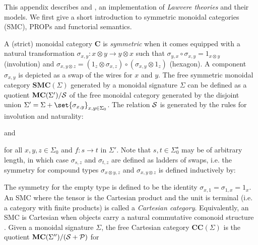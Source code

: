 
This appendix describes  and , an
implementation of \emph{Lawvere theories} and their models.
We first give a short introduction to symmetric monoidal categories (SMC), PROPs and functorial semantics.

A (strict) monoidal category $\mathbf{C}$ is \emph{symmetric} when it comes equipped
with a natural transformation $\sigma_{x, y} : x \otimes y \to y \otimes x$
such that $\sigma_{y, x} \circ \sigma_{x, y} = 1_{x \otimes y}$ (involution)
and $\sigma_{x, y \otimes z} =
(1_{z} \otimes \sigma_{x, z}) \circ (\sigma_{x, y} \otimes 1_{z})$ (hexagon).
A component $\sigma_{x, y}$ is depicted as a swap of the wires for $x$ and $y$.
The free symmetric monoidal category $\mathbf{SMC}(\Sigma)$ generated by a monoidal
signature $\Sigma$ can be defined as a quotient $\mathbf{MC}(\Sigma') / \cal{S}$ of
the free monoidal category generated by the disjoint union
$\Sigma' = \Sigma + \set{\sigma_{x, y}}_{x, y \in \Sigma_0}$. The relation
$\cal{S}$ is generated by the rules for involution and naturality:
\begin{center}

\qquad and \qquad \quad

\end{center}
for all $x, y, z \in \Sigma_0$ and $f : s \to t$ in $\Sigma'$. Note that
$s, t \in \Sigma_0^\star$ may be of arbitrary length, in which case $\sigma_{s, z}$ and $\sigma_{t, z}$ are defined as ladders of swaps,
i.e. the symmetry for compound types $\sigma_{x \otimes y, z}$ and
$\sigma_{x, y \otimes z}$ is defined inductively by:
\begin{center}

\end{center}
The symmetry for the empty type is defined to be the identity
$\sigma_{x, 1} = \sigma_{1, x} = 1_x$.
% 
An SMC where the tensor is the Cartesian product and the unit is terminal
(i.e. a category with finite products) is called a \emph{Cartesian category}.
Equivalently, an SMC is Cartesian when objects carry a natural
commutative comonoid structure \cite[6.1]{Selinger10}.
Given a monoidal signature $\Sigma$, the free Cartesian category
$\mathbf{CC}(\Sigma)$ is the quotient
$\mathbf{MC}(\Sigma'') / (\cal{S} + \cal{P})$ for
